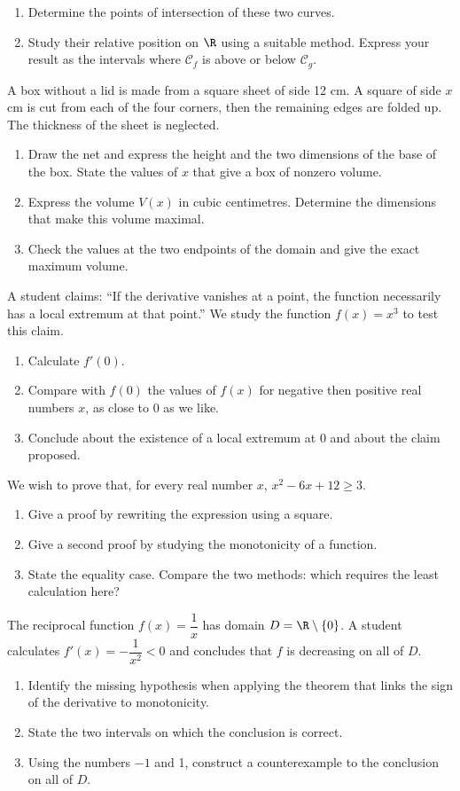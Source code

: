 \begin{enumerate}[label=\arabic*.]
\item Determine the points of intersection of these two curves.
\item Study their relative position on $\R$ using a suitable method. Express your result as the intervals where $\mathcal C_f$ is above or below $\mathcal C_g$.
\end{enumerate}
A box without a lid is made from a square sheet of side 12 cm. A square of side $x$ cm is cut from each of the four corners, then the remaining edges are folded up. The thickness of the sheet is neglected.
\begin{enumerate}[label=\arabic*.]
\item Draw the net and express the height and the two dimensions of the base of the box. State the values of $x$ that give a box of nonzero volume.
\item Express the volume $V(x)$ in cubic centimetres. Determine the dimensions that make this volume maximal.
\item Check the values at the two endpoints of the domain and give the exact maximum volume.
\end{enumerate}
A student claims: ``If the derivative vanishes at a point, the function necessarily has a local extremum at that point.'' We study the function $f(x)=x^3$ to test this claim.
\begin{enumerate}[label=\arabic*.]
\item Calculate $f\prime(0)$.
\item Compare with $f(0)$ the values of $f(x)$ for negative then positive real numbers $x$, as close to 0 as we like.
\item Conclude about the existence of a local extremum at 0 and about the claim proposed.
\end{enumerate}
We wish to prove that, for every real number $x$, $x^2-6x+12\geq3$.
\begin{enumerate}[label=\arabic*.]
\item Give a proof by rewriting the expression using a square.
\item Give a second proof by studying the monotonicity of a function.
\item State the equality case. Compare the two methods: which requires the least calculation here?
\end{enumerate}
The reciprocal function $f(x)=\dfrac1x$ has domain $D=\R\setminus\{0\}$. A student calculates $f\prime(x)=-\dfrac1{x^2}<0$ and concludes that $f$ is decreasing on all of $D$.
\begin{enumerate}[label=\arabic*.]
\item Identify the missing hypothesis when applying the theorem that links the sign of the derivative to monotonicity.
\item State the two intervals on which the conclusion is correct.
\item Using the numbers $-1$ and 1, construct a counterexample to the conclusion on all of $D$.
\end{enumerate}
